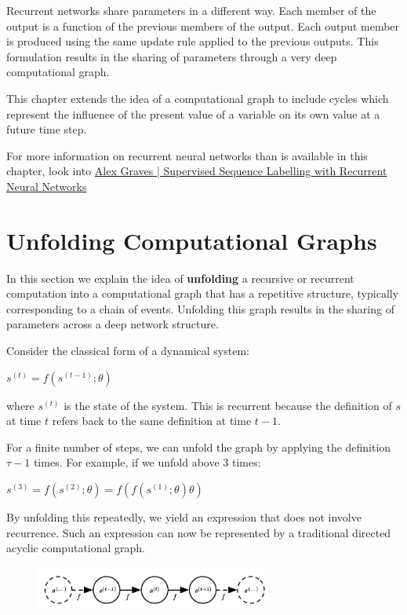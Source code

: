 \documentclass[onecolumn, letterpaper, 12pt]{report}
\begin{document}
Recurrent networks share parameters in a different way. Each member of the output is a function of the previous members of the output. Each output member is produced using the same update rule applied to the previous outputs. This formulation results in the sharing of parameters through a very deep computational graph. 

This chapter extends the idea of a computational graph to include cycles which represent the influence of the present value of a variable on its own value at a future time step. 

For more information on recurrent neural networks than is available in this chapter, look into \href{https://www.cs.toronto.edu/~graves/preprint.pdf}{Alex Graves | Supervised Sequence Labelling with Recurrent Neural Networks}

\section{Unfolding Computational Graphs}

In this section we explain the idea of \textbf{unfolding} a recursive or recurrent computation into a computational graph that has a repetitive structure, typically corresponding to a chain of events. Unfolding this graph results in the sharing of parameters across a deep network structure. 

Consider the classical form of a dynamical system: 

\begin{center}
  $s^{(t)} = f(s^{(t-1)}; \theta)$
\end{center}

where $s^{(t)}$ is the state of the system. This is recurrent because the definition of $s$ at time $t$ refers back to the same definition at time $t-1$. 

For a finite number of steps, we can unfold the graph by applying the definition $\tau - 1$ times. For example, if we unfold above 3 times:

\begin{center}
  $s^{(3)} = f(s^{(2)}; \theta) = f(f(s^{(1)}; \theta) \theta)$
\end{center}

By unfolding this repeatedly, we yield an expression that does not involve recurrence. Such an expression can now be represented by a traditional directed acyclic computational graph. 

\begin{figure}[h]
  \centering
  \includegraphics[width=0.7\textwidth]{trad_dag.png}
\end{figure}
\end{document}
